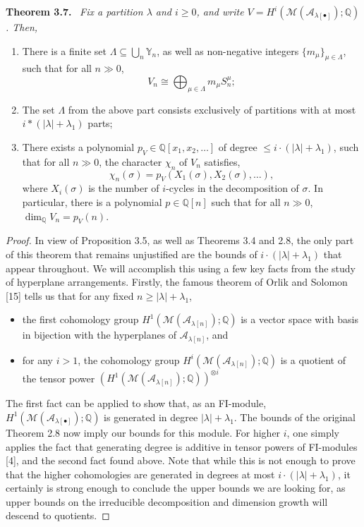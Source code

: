 \documentclass[10pt,a4paper]{article}
\newenvironment{sourceblock}[1]{\par\medskip\noindent\textbf{#1.}\ \itshape}{\par\medskip}
\begin{document}
\begin{sourceblock}{Theorem 3.7}
Fix a partition $\lambda$ and $i\geq0$, and write $V=H^i(\mathcal{M}(\mathcal{A}_{\lambda[\bullet]});\mathbb{Q})$. Then,
\begin{enumerate}
\item There is a finite set $\Lambda\subseteq\bigcup_n\mathbb{Y}_n$, as well as non-negative integers $\{m_\mu\}_{\mu\in\Lambda}$, such that for all $n\gg0$,
\[
 V_n\cong\bigoplus_{\mu\in\Lambda}m_\mu S_n^\mu;
\]
\item The set $\Lambda$ from the above part consists exclusively of partitions with at most $i*(|\lambda|+\lambda_1)$ parts;
\item There exists a polynomial $p_V\in\mathbb{Q}[x_1,x_2,\ldots]$ of degree $\leq i\cdot(|\lambda|+\lambda_1)$, such that for all $n\gg0$, the character $\chi_n$ of $V_n$ satisfies,
\[
 \chi_n(\sigma)=p_V(X_1(\sigma),X_2(\sigma),\ldots),
\]
where $X_i(\sigma)$ is the number of $i$-cycles in the decomposition of $\sigma$. In particular, there is a polynomial $p\in\mathbb{Q}[n]$ such that for all $n\gg0$, $\dim_{\mathbb{Q}}V_n=p_V(n)$.
\end{enumerate}
\end{sourceblock}

\begin{proof}
In view of Proposition 3.5, as well as Theorems 3.4 and 2.8, the only part of this theorem that remains unjustified are the bounds of $i\cdot(|\lambda|+\lambda_1)$ that appear throughout. We will accomplish this using a few key facts from the study of hyperplane arrangements. Firstly, the famous theorem of Orlik and Solomon [15] tells us that for any fixed $n\geq|\lambda|+\lambda_1$,
\begin{itemize}
\item the first cohomology group $H^1(\mathcal{M}(\mathcal{A}_{\lambda[n]});\mathbb{Q})$ is a vector space with basis in bijection with the hyperplanes of $\mathcal{A}_{\lambda[n]}$, and
\item for any $i>1$, the cohomology group $H^i(\mathcal{M}(\mathcal{A}_{\lambda[n]});\mathbb{Q})$ is a quotient of the tensor power $(H^1(\mathcal{M}(\mathcal{A}_{\lambda[n]});\mathbb{Q}))^{\otimes i}$
\end{itemize}
The first fact can be applied to show that, as an FI-module, $H^1(\mathcal{M}(\mathcal{A}_{\lambda[\bullet]});\mathbb{Q})$ is generated in degree $|\lambda|+\lambda_1$. The bounds of the original Theorem 2.8 now imply our bounds for this module. For higher $i$, one simply applies the fact that generating degree is additive in tensor powers of FI-modules [4], and the second fact found above. Note that while this is not enough to prove that the higher cohomologies are generated in degrees at most $i\cdot(|\lambda|+\lambda_1)$, it certainly is strong enough to conclude the upper bounds we are looking for, as upper bounds on the irreducible decomposition and dimension growth will descend to quotients.
\end{proof}
\end{document}
